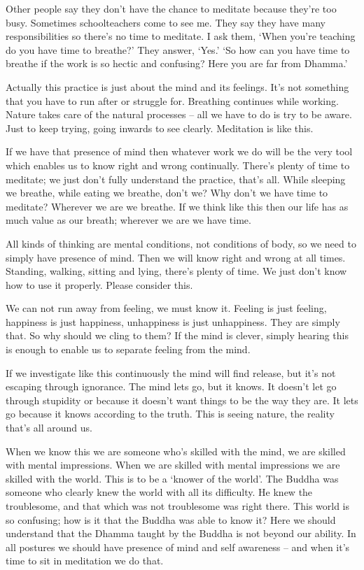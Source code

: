 Other people say they don't have the chance to meditate because they're too busy. Sometimes schoolteachers come to see me. They say they have many responsibilities so there's no time to meditate. I ask them, `When you're teaching do you have time to breathe?' They answer, `Yes.' `So how can you have time to breathe if the work is so hectic and confusing? Here you are far from Dhamma.'

Actually this practice is just about the mind and its feelings. It's not something that you have to run after or struggle for. Breathing continues while working. Nature takes care of the natural processes -- all we have to do is try to be aware. Just to keep trying, going inwards to see clearly. Meditation is like this.

If we have that presence of mind then whatever work we do will be the very tool which enables us to know right and wrong continually. There's plenty of time to meditate; we just don't fully understand the practice, that's all. While sleeping we breathe, while eating we breathe, don't we? Why don't we have time to meditate? Wherever we are we breathe. If we think like this then our life has as much value as our breath; wherever we are we have time.

All kinds of thinking are mental conditions, not conditions of body, so we need to simply have presence of mind. Then we will know right and wrong at all times. Standing, walking, sitting and lying, there's plenty of time. We just don't know how to use it properly. Please consider this.

We can not run away from feeling, we must know it. Feeling is just feeling, happiness is just happiness, unhappiness is just unhappiness. They are simply that. So why should we cling to them? If the mind is clever, simply hearing this is enough to enable us to separate feeling from the mind.

If we investigate like this continuously the mind will find release, but it's not escaping through ignorance. The mind lets go, but it knows. It doesn't let go through stupidity or because it doesn't want things to be the way they are. It lets go because it knows according to the truth. This is seeing nature, the reality that's all around us.

When we know this we are someone who's skilled with the mind, we are skilled with mental impressions. When we are skilled with mental impressions we are skilled with the world. This is to be a `knower of the world'. The Buddha was someone who clearly knew the world with all its difficulty. He knew the troublesome, and that which was not troublesome was right there. This world is so confusing; how is it that the Buddha was able to know it? Here we should understand that the Dhamma taught by the Buddha is not beyond our ability. In all postures we should have presence of mind and self awareness -- and when it's time to sit in meditation we do that.

